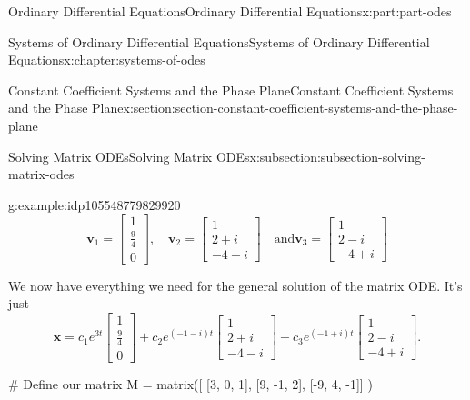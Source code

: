 \documentclass[oneside,10pt,]{book}
\numberwithin{equation}{part}
\renewcommand{\vec}[1]{\mathbf{#1}}
\begin{document}
\begin{partptx}{Ordinary Differential Equations}{}{Ordinary Differential Equations}{}{}{x:part:part-odes}
\begin{chapterptx}{Systems of Ordinary Differential Equations}{}{Systems of Ordinary Differential Equations}{}{}{x:chapter:systems-of-odes}
\begin{sectionptx}{Constant Coefficient Systems and the Phase Plane}{}{Constant Coefficient Systems and the Phase Plane}{}{}{x:section:section-constant-coefficient-systems-and-the-phase-plane}
\begin{subsectionptx}{Solving Matrix ODEs}{}{Solving Matrix ODEs}{}{}{x:subsection:subsection-solving-matrix-odes}
\begin{example}{}{g:example:idp105548779829920}
\begin{equation*}
\vec{v}_{1} = \begin{bmatrix}1 \\ \frac{9}{4} \\ 0\end{bmatrix}, \quad\vec{v}_{2} = \begin{bmatrix} 1 \\ 2 + i \\ -4 - i \end{bmatrix}\quad\text{and}\vec{v}_{3} = \begin{bmatrix} 1 \\ 2 - i \\ -4 + i \end{bmatrix}
\end{equation*}
%
\par
We now have everything we need for the general solution of the matrix ODE. It's just%
\begin{equation*}
\vec{x} = c_{1}e^{3t}\begin{bmatrix}1 \\ \frac{9}{4} \\ 0\end{bmatrix} + c_{2}e^{(-1 - i)t}\begin{bmatrix} 1 \\ 2 + i \\ -4 - i \end{bmatrix} + c_{3}e^{(-1 + i)t}\begin{bmatrix} 1 \\ 2 - i \\ -4 + i \end{bmatrix}.
\end{equation*}
%
\end{example}
\begin{sageinput}
# Define our matrix
M = matrix([ [3, 0, 1],
[9, -1, 2],
[-9, 4, -1]] )


\end{sageinput}
\end{subsectionptx}
\end{sectionptx}
\end{chapterptx}
\end{partptx}
\end{document}
